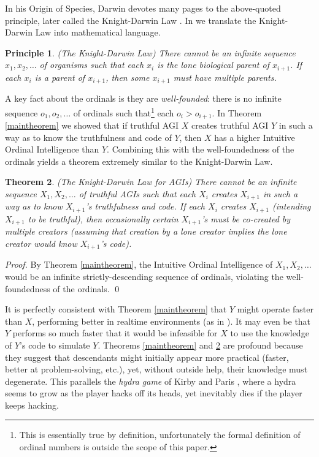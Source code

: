 \documentclass[runningheads]{llncs}
\newtheorem{mytheorem}{Theorem}
\newtheorem{myprinciple}[mytheorem]{Principle}
\begin{document}
In his Origin of Species, Darwin devotes many
pages to the above-quoted principle, later called the
Knight-Darwin Law \cite{darwin1898knight}. In \cite{alexander2013}
we translate
the Knight-Darwin Law into mathematical language.

\begin{myprinciple}
(The Knight-Darwin Law)
There cannot be an infinite sequence
$x_1,x_2,\ldots$ of organisms such that each $x_i$
is the lone biological parent of $x_{i+1}$.
If each $x_i$ is a parent of $x_{i+1}$, then some $x_{i+1}$
must have multiple parents.
\end{myprinciple}

A key fact about the ordinals is they
are \emph{well-founded}:
there is
no infinite sequence $o_1,o_2,\ldots$ of ordinals such that\footnote{This
is essentially true by definition,
unfortunately the formal definition of ordinal numbers is outside the scope of
this paper.} each
$o_i>o_{i+1}$. In Theorem \ref{maintheorem} we showed that if truthful
AGI $X$ creates truthful AGI $Y$ in such a way as to know the truthfulness
and code of $Y$, then $X$ has a higher Intuitive Ordinal Intelligence
than $Y$. Combining this with the well-foundedness of the ordinals yields
a theorem extremely similar to the Knight-Darwin Law.

\begin{mytheorem}
\label{maintheorem2}
(The Knight-Darwin Law for AGIs)
There cannot be an infinite sequence
$X_1,X_2,\ldots$ of truthful AGIs such that each $X_i$
creates $X_{i+1}$ in such a way as to know $X_{i+1}$'s truthfulness and code.
If each $X_i$ creates $X_{i+1}$ (intending $X_{i+1}$ to be truthful), then
occasionally certain $X_{i+1}$'s must be
co-created by multiple creators (assuming that creation by
a lone creator implies the lone creator would know $X_{i+1}$'s code).
\end{mytheorem}

\begin{proof}
By Theorem \ref{maintheorem}, the Intuitive Ordinal Intelligence of $X_1,X_2,\ldots$
would be an infinite strictly-descending sequence of ordinals, violating
the well-foundedness of the ordinals.
\qed
\end{proof}

It is perfectly consistent with
Theorem \ref{maintheorem} that $Y$ might operate faster
than $X$, performing better in realtime environments (as in \cite{gavane}).
It may even be that $Y$ performs so much faster that it would be infeasible for
$X$ to use the knowledge of $Y$'s code to simulate $Y$.
Theorems \ref{maintheorem} and \ref{maintheorem2} are profound because
they suggest that descendants might initially appear more practical
(faster, better at problem-solving, etc.),
yet, without outside help, their knowledge must degenerate.
This parallels the \emph{hydra game} of
Kirby and Paris \cite{kirby1982accessible}, where a hydra
seems to grow as the player hacks off its heads, yet
inevitably dies if the player keeps hacking.
\end{document}
